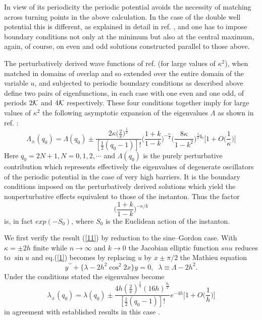 \documentclass[a4paper,12pt,a4]{article}
\begin{document}
In view of its periodicity the periodic potential avoids the
necessity of matching across turning points in the above calculation.
In the case of the double well potential this is
different, as explained in detail in ref. \cite{10}, and
one has to impose boundary conditions not only at the minimum but also
at the central maximum, again, of course, on even and
odd solutions constructed parallel to those above.


The perturbatively derived wave functions of ref.\cite{7}
(for large values of $\kappa^2$),
when matched in domains of overlap and so extended over the entire
domain of the variable $u$, and subjected to periodic
boundary conditions as described above  define two pairs of eigenfunctions,
in each case with one even and one odd, of periods $2{\cal K}$
and $4{\cal K}$ respectively. These four conditions together
imply for large values of $\kappa^2$ the following asymptotic
expansion of the eigenvalues $\Lambda$ as shown in ref. \cite{7}:
\begin{equation}
\Lambda_{\pm}(q_0)=\Lambda(q_0)\pm
\frac{2\kappa\bigg(\frac{2}{\pi}\bigg)^{\frac{1}{2}}}{[\frac{1}{2}(q_0-1)]!}
\bigg(\frac{1+k}{1-k}\bigg)^{-\frac{\kappa}{k}}\bigg(\frac{8\kappa}{1-k^2}
\bigg)^{\frac{1}{2}q_0}\bigg[1+O\bigg(\frac{1}{\kappa}\bigg)\bigg]
\label{11}
\end{equation}
Here $q_0=2N+1, N=0,1,2,\cdots$ and $\Lambda (q_0)$ is
the purely perturbative contribution which represents
effectively the eigenvalues of degenerate oscillators 
of the periodic potential in the case of very high barriers. 
It is the boundary conditions imposed on the perturbatively derived
solutions which yield the nonperturbative effects
equivalent to those of the instanton.  Thus the factor
$$
\bigg(\frac{1+k}{1-k}\bigg)^{-\kappa/k}
$$
is, in fact $exp(-S_0)$, where $S_0$ is the Euclidean action
of the instanton.

\vspace{0.2cm}

We first verify the result (\ref{11}) by reduction to the sine--Gordon
case. With $\kappa=\pm 2h$ finite
 while $n\rightarrow\infty$ and $k\rightarrow 0$
the Jacobian elliptic function $sn u$ reduces to $\sin u$ 
and eq.(\ref{1}) becomes by replacing $u$ by $x\pm \pi/2$
the Mathieu equation
\begin{equation}
y^{\prime\prime}+\bigg\{\lambda-2h^2\cos^2 2x\bigg\}y=0,
\;\; \lambda\equiv \Lambda-2h^2.
\label{12}
\end{equation}
Under the conditions stated the eigenvalues become
\begin{equation}
\lambda_{\pm}(q_0) 
=\lambda(q_0)
\pm\frac{4h(\frac{2}{\pi})^{\frac{1}{2}}(16h)^{\frac{q_0}{2}}}
{[\frac{1}{2}(q_0-1)]!}e^{-4h}\bigg[1+O\bigg(\frac{1}{h}\bigg)\bigg]
\label{13}
\end{equation}
in agreement with established results in this case \cite{9,10,11}. 
\end{document}
